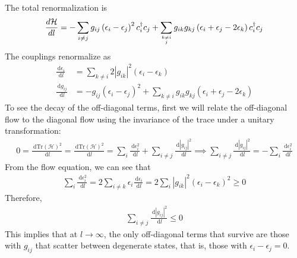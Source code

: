The total renormalization is
\begin{equation}
	\frac{d\mathcal{H}}{dl} = -\sum_{i\neq j} g_{ij}\left(\epsilon_i - \epsilon_j\right)^2 c^\dagger_i c_j + \sum_{k\neq i\atop{j}}g_{ik}g_{kj}\left( \epsilon_i + \epsilon_j - 2\epsilon_k \right) c^\dagger_i c_j
\end{equation}
The couplings renormalize as
\begin{equation}\begin{aligned}
	\frac{\:\mathrm{d}\epsilon_i}{\:\mathrm{d}l} &= \sum_{k \neq i} 2|g_{ik}|^2\left( \epsilon_i - \epsilon_k \right)\\
	\frac{\:\mathrm{d}g_{ij}}{\:\mathrm{d}l} &= - g_{ij}\left(\epsilon_i - \epsilon_j\right)^2 + \sum_{k \neq i}g_{ik}g_{kj}\left( \epsilon_i + \epsilon_j - 2\epsilon_k \right)
\end{aligned}\end{equation}
To see the decay of the off-diagonal terms, first we will relate the off-diagonal flow to the diagonal flow using the invariance of the trace under a unitary transformation:
\begin{equation}\begin{aligned}
	0 = \frac{\:\mathrm{d}\text{Tr}\left( \mathcal{H} \right) ^2}{\:\mathrm{d}l} = \frac{\:\mathrm{d}\text{Tr}\left( \mathcal{H} \right) ^2}{\:\mathrm{d}l} = \sum_i \frac{\:\mathrm{d} \epsilon_i^2 }{\:\mathrm{d}l} + \sum_{i\neq j}\frac{\:\mathrm{d}|g_{ij}|^2}{\:\mathrm{d}l} \implies \sum_{i\neq j}\frac{\:\mathrm{d}|g_{ij}|^2}{\:\mathrm{d}l} = -\sum_i \frac{\:\mathrm{d} \epsilon_i^2 }{\:\mathrm{d}l}
\end{aligned}\end{equation}
From the flow equation, we can see that
\begin{equation}\begin{aligned}
	\sum_i \frac{\:\mathrm{d} \epsilon_i^2 }{\:\mathrm{d}l} = 2\sum_{i \neq k} \epsilon_i \frac{\:\mathrm{d} \epsilon_i }{\:\mathrm{d}l} = 2 \sum_i |g_{ik}|^2 \left( \epsilon_i - \epsilon_k \right) ^2 \geq 0
\end{aligned}\end{equation}
Therefore,
\begin{equation}\begin{aligned}
	\sum_{i\neq j}\frac{\:\mathrm{d}|g_{ij}|^2}{\:\mathrm{d}l} \leq 0
\end{aligned}\end{equation}
This implies that at \(l \to \infty\), the only off-diagonal terms that survive are those with \(g_{ij}\) that scatter between degenerate states, that is, those with \(\epsilon_i - \epsilon_j = 0\).
